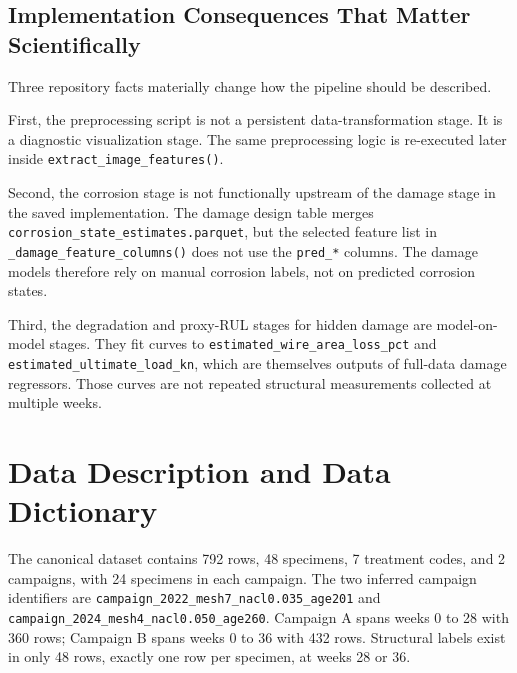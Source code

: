 \documentclass[11pt,a4paper]{article}
\newcommand{\campaignA}{\texttt{campaign\_2022\_mesh7\_nacl0.035\_age201}}
\newcommand{\campaignB}{\texttt{campaign\_2024\_mesh4\_nacl0.050\_age260}}
\begin{document}
\subsection{Implementation Consequences That Matter Scientifically}

Three repository facts materially change how the pipeline should be described.

First, the preprocessing script is not a persistent data-transformation stage. It is a diagnostic visualization stage. The same preprocessing logic is re-executed later inside \texttt{extract\_image\_features()}.

Second, the corrosion stage is not functionally upstream of the damage stage in the saved implementation. The damage design table merges \texttt{corrosion\_state\_estimates.parquet}, but the selected feature list in \texttt{\_damage\_feature\_columns()} does not use the \texttt{pred\_*} columns. The damage models therefore rely on manual corrosion labels, not on predicted corrosion states.

Third, the degradation and proxy-RUL stages for hidden damage are model-on-model stages. They fit curves to \texttt{estimated\_wire\_area\_loss\_pct} and \texttt{estimated\_ultimate\_load\_kn}, which are themselves outputs of full-data damage regressors. Those curves are not repeated structural measurements collected at multiple weeks.

\section{Data Description and Data Dictionary}

The canonical dataset contains 792 rows, 48 specimens, 7 treatment codes, and 2 campaigns, with 24 specimens in each campaign. The two inferred campaign identifiers are \campaignA{} and \campaignB{}. Campaign A spans weeks 0 to 28 with 360 rows; Campaign B spans weeks 0 to 36 with 432 rows. Structural labels exist in only 48 rows, exactly one row per specimen, at weeks 28 or 36.
\end{document}
